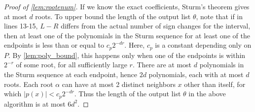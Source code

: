 \documentclass[10pt,a4paper]{amsart}
\begin{document}
\begin{proof}[Proof of \cref{lem:rootenum}]
	If we know the exact coefficients, Sturm's theorem gives at most
	$d$ roots. To upper bound the length of the output list $\theta$,
	note that if in lines 13-15, $L-R$ differs from the actual number of
	sign changes for the interval, then at least one of the polynomials
	in the Sturm sequence for at least one of the endpoints is less than
	or equal to $c_p 2^{-dr}$. Here, $c_p$ is a constant depending only
	on $P$. By \cref{lem:poly_bound}, this happens only when one of the
	endpoints is within $2^{-r}$ of some root, for all sufficiently
	large $r$. There are at most $d$ polynomials in the Sturm sequence
	at each endpoint, hence $2d$ polynomials, each with at most $d$
	roots. Each root $\alpha$ can have at most 2 distinct neighbors $x$
	other than itself, for which $|p(x)| < c_p 2^{-dr}$. Thus the length
	of the output list $\theta$ in the above algorithm is at most $6d^2$.
\end{proof}
\end{document}
